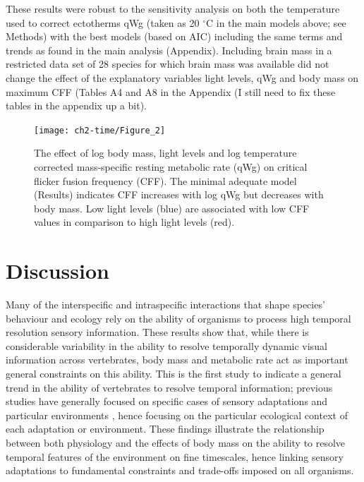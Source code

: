 These results were robust to the sensitivity analysis on both the temperature used to correct ectotherms qWg (taken as 20 $^{\circ}$C in the main models above; see Methods) 
with the best models (based on AIC) including the same terms and trends as found in the main analysis (Appendix). Including brain mass in a restricted data set of 28 species for which brain mass was available did not change the effect of the explanatory variables light levels, qWg and body mass on maximum CFF (Tables A4 and A8 in the Appendix (I still need to fix these tables in the appendix up a bit).


\begin{figure}[h!]
  \centering
  \texttt{[image: ch2-time/Figure\_2]}%
  \caption[Figure 3.]{ The effect of  log body mass, light levels and log temperature corrected mass-specific resting metabolic rate (qWg) on critical flicker fusion frequency (CFF). The minimal adequate model (Results) indicates CFF increases with log qWg but decreases with body mass. Low light levels (blue) are associated with low CFF values in comparison to high light levels (red).}
  \label{fig:Figure 3.}
\end{figure}


\section{Discussion}
Many of the interspecific and intraspecific interactions that shape species' behaviour and ecology rely on the ability of organisms to process high temporal resolution sensory information. These results show that, while there is considerable variability in the ability to resolve temporally dynamic visual information across vertebrates, body mass and metabolic rate act as important general constraints on this ability. This is the first study to indicate a general trend in the ability of vertebrates to resolve temporal information; previous studies have generally focused on specific cases of sensory adaptations \citep{fritsches2005warm} and particular environments \citep{frank1999comparative,frank2012light}, hence focusing on the particular ecological context of each adaptation or environment. These findings illustrate the relationship between both physiology and the effects of body mass on the ability to resolve temporal features of the environment on fine timescales, hence linking sensory adaptations to fundamental constraints and trade-offs imposed on all organisms.


